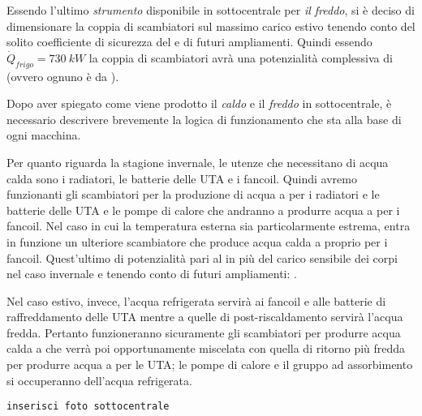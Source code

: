 Essendo l'ultimo \emph{strumento} disponibile in sottocentrale per \emph{il freddo}, si è deciso di dimensionare la coppia di scambiatori sul massimo carico estivo tenendo conto del solito coefficiente di sicurezza del  e di futuri ampliamenti. Quindi essendo $\dot{Q}_{frigo}= \SI{730}{kW}$ la coppia di scambiatori avrà una potenzialità complessiva di  (ovvero ognuno è da ).

\vspace{1em}

Dopo aver spiegato come viene prodotto il \emph{caldo} e il \emph{freddo} in sottocentrale, è necessario descrivere brevemente la logica di funzionamento che sta alla base di ogni macchina.

Per quanto riguarda la stagione invernale, le utenze che necessitano di acqua calda sono i radiatori, le batterie delle UTA e i fancoil. Quindi avremo funzionanti gli scambiatori per la produzione di acqua a  per i radiatori e le batterie delle UTA e le pompe di calore che andranno a produrre acqua a  per i fancoil. Nel caso in cui la temperatura esterna sia particolarmente estrema, entra in funzione un ulteriore scambiatore che produce acqua calda a  proprio per i fancoil. Quest'ultimo di potenzialità pari al  in più del carico sensibile dei corpi nel caso invernale e tenendo conto di futuri ampliamenti: . 

Nel caso estivo, invece, l'acqua refrigerata servirà ai fancoil e alle batterie di raffreddamento delle UTA mentre a quelle di post-riscaldamento servirà l'acqua fredda. Pertanto funzioneranno sicuramente gli scambiatori per produrre acqua calda a  che verrà poi opportunamente miscelata con quella di ritorno più fredda per produrre acqua a  per le UTA; le pompe di calore e il gruppo ad assorbimento si occuperanno dell'acqua refrigerata.

\texttt{inserisci foto sottocentrale}
